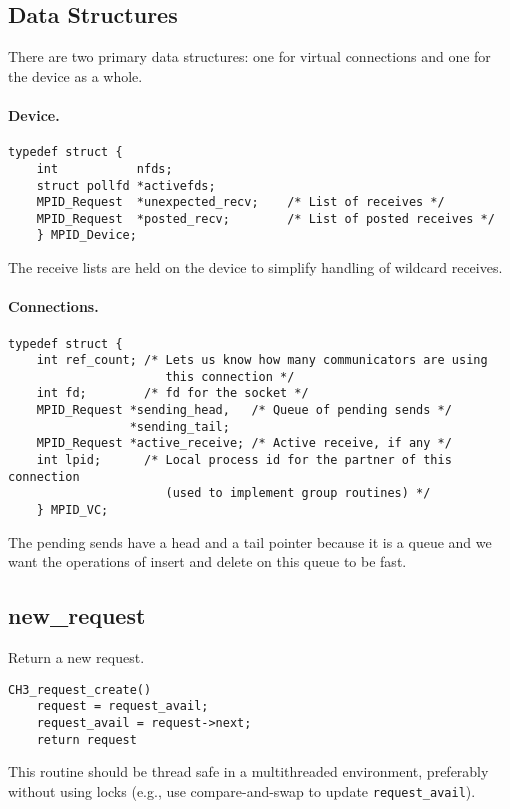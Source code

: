 \documentclass{article}
\def\code{\begingroup\makeustext\eatcode}
\def\eatcode#1{\texttt{#1}\endgroup}
\begin{document}
\subsection{Data Structures}
There are two primary data structures: one for virtual connections and one for
the device as a whole.

\paragraph{Device.}
\begin{verbatim}
typedef struct {
    int           nfds;
    struct pollfd *activefds;
    MPID_Request  *unexpected_recv;    /* List of receives */
    MPID_Request  *posted_recv;        /* List of posted receives */
    } MPID_Device;
\end{verbatim}
The receive lists are held on the device to simplify handling of wildcard
receives.  

\paragraph{Connections.}

\begin{verbatim}
typedef struct { 
    int ref_count; /* Lets us know how many communicators are using
                      this connection */
    int fd;        /* fd for the socket */
    MPID_Request *sending_head,   /* Queue of pending sends */
                 *sending_tail;
    MPID_Request *active_receive; /* Active receive, if any */
    int lpid;      /* Local process id for the partner of this connection
                      (used to implement group routines) */
    } MPID_VC;
\end{verbatim}
The pending sends have a head and a tail pointer because it is a queue and we
want the operations of insert and delete on this queue to be fast.

\subsection{new\_request}
Return a new request.  

\begin{verbatim}
CH3_request_create() 
    request = request_avail;
    request_avail = request->next;
    return request
\end{verbatim}
This routine should be thread safe in a multithreaded environment, preferably
without using locks (e.g., use compare-and-swap to update
\code{request_avail}).  
\end{document}
